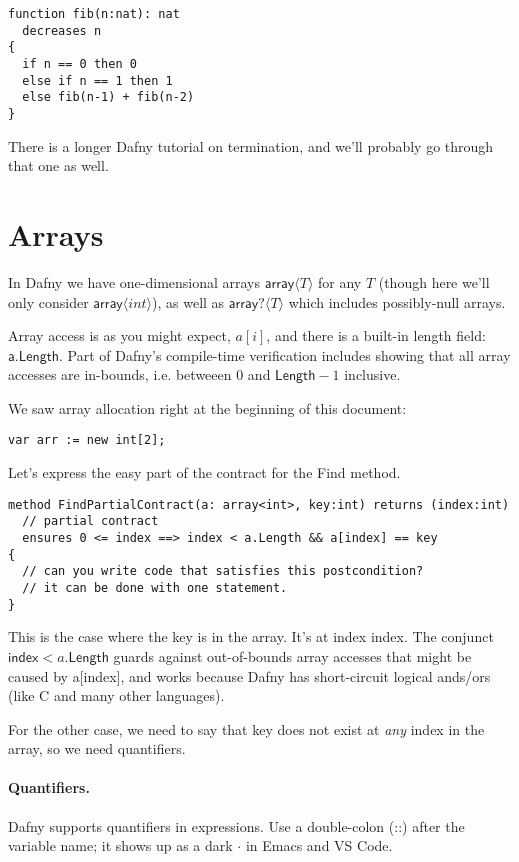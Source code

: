 \documentclass[11pt]{article}
\begin{document}
\begin{lstlisting}[language=dafny]
function fib(n:nat): nat
  decreases n
{
  if n == 0 then 0
  else if n == 1 then 1
  else fib(n-1) + fib(n-2)
}
\end{lstlisting}

There is a longer Dafny tutorial on termination, and we'll probably go through that one as well.

\section*{Arrays}
In Dafny we have one-dimensional arrays $\mathsf{array}\langle T \rangle$ for any $T$ (though here we'll only consider
$\mathsf{array}\langle int \rangle$), as well as $\mathsf{array}?\langle T \rangle$ which includes possibly-null arrays.

Array access is as you might expect, $a[i]$, and there is a built-in
length field: $\mathsf{a}.\mathsf{Length}$.  Part of Dafny's
compile-time verification includes showing that all array accesses are
in-bounds, i.e.  betweeen 0 and $\textsf{Length}-1$ inclusive.

We saw array allocation right at the beginning of this document:
\begin{lstlisting}[language=dafny]
    var arr := new int[2];
\end{lstlisting}

Let's express the easy part of the contract for the \textsf{Find} method.
\begin{lstlisting}[language=dafny]
method FindPartialContract(a: array<int>, key:int) returns (index:int)
  // partial contract
  ensures 0 <= index ==> index < a.Length && a[index] == key
{
  // can you write code that satisfies this postcondition?
  // it can be done with one statement.
}
\end{lstlisting}
This is the case where the key is in the array. It's at index \textsf{index}.
The conjunct $\mathsf{index} < a.\mathsf{Length}$ guards against out-of-bounds array
accesses that might be caused by \textsf{a[index]}, and works because Dafny has short-circuit
logical ands/ors (like C and many other languages).

For the other case, we need to say that \textsf{key} does not exist at \emph{any}
index in the array, so we need quantifiers.

\paragraph{Quantifiers.} Dafny supports quantifiers in expressions. Use a double-colon (::)
after the variable name; it shows up as a dark $\cdot$ in Emacs and VS Code.
\end{document}
